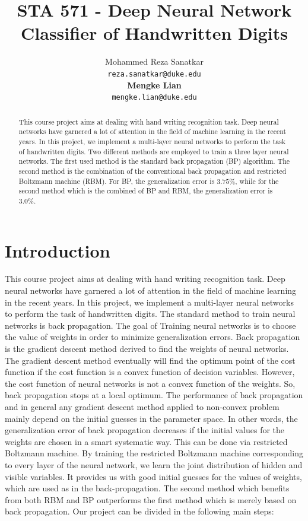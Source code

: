 \documentclass{article} %
\title{STA 571 - Deep Neural Network Classifier of Handwritten Digits}
\author{
Mohammed Reza Sanatkar \\
\texttt{reza.sanatkar@duke.edu} \\
\textbf{Mengke Lian} \\
\texttt{mengke.lian@duke.edu}
}
\begin{document}
\maketitle

\begin{abstract}
This course project aims at dealing with hand writing recognition task.
Deep neural networks have garnered a lot of attention in the field of machine learning in the recent years.
In this project, we implement a multi-layer neural networks to perform the task of handwritten digits.
Two different methods are employed to train a three layer neural networks. The first used method is the standard back propagation (BP) algorithm. The second method is the combination of the conventional back propagation and restricted Boltzmann machine (RBM).  
For BP, the generalization error is $3.75\%$, while for the second method which is the combined of BP and RBM, the generalization error is $3.0\%$. 
\end{abstract}

\section{Introduction}

This course project aims at dealing with hand writing recognition task.
Deep neural networks have garnered a lot of attention in the field of machine learning in the recent years. In this project, we implement a multi-layer neural networks to perform the task of handwritten digits. The standard method to train neural networks is back propagation. The goal of Training neural networks is to choose the value of weights in order to minimize generalization errors. Back propagation is the gradient descent method derived to find the weights of neural networks. The gradient descent method eventually will find the optimum point of the cost function if the cost function is a convex function of decision variables. However, the cost function of neural networks is not a convex function of the weights. So, back propagation stops at a local optimum. The performance of back propagation and in general any gradient descent method applied to non-convex problem mainly depend on the initial guesses in the parameter space. In other words, the generalization error of back propagation decreases if the initial values for the weights are chosen in a smart systematic way. This can be done via restricted Boltzmann machine. By training the restricted Boltzmann machine corresponding to every layer of the neural network, we learn the joint distribution of hidden and visible variables. It provides us with good initial guesses for the values of weights, which are used as in the back-propagation. The second method which benefits from both RBM and BP outperforms the first method which is merely based on back propagation. 
 Our project can be divided in the following main steps:
\end{document}
